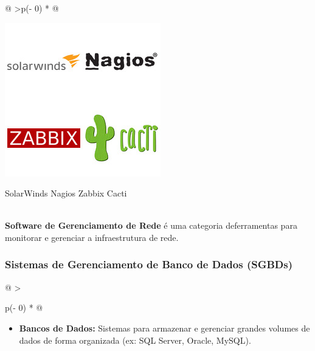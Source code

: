 \documentclass[
]{book}
\providecommand{\tightlist}{%
  \setlength{\itemsep}{0pt}\setlength{\parskip}{0pt}}
\begin{document}
\begin{longtable}[]{@{}
  >{\centering\arraybackslash}p{(\columnwidth - 0\tabcolsep) * }@{}}
\toprule\noalign{}
\endhead
\bottomrule\noalign{}
\endlastfoot
\begin{minipage}[t]{\linewidth}\centering
\begin{center}
\includegraphics{images/InfraEstrutura/software/monitoramento.jpg}

SolarWinds Nagios Zabbix Cacti
\end{center}
\end{minipage} \\
\textbf{Software de Gerenciamento de Rede} é uma categoria deferramentas para monitorar e gerenciar a infraestrutura de rede. \\
\end{longtable}

\subsubsection{Sistemas de Gerenciamento de Banco de Dados (SGBDs)}\label{sistemas-de-gerenciamento-de-banco-de-dados-sgbds}

\begin{longtable}[]{@{}
  >{\raggedright\arraybackslash}p{(\columnwidth - 0\tabcolsep) * }@{}}
\toprule\noalign{}
\endhead
\bottomrule\noalign{}
\endlastfoot
\begin{minipage}[t]{\linewidth}\raggedright
\begin{itemize}
\tightlist
\item
  \textbf{Bancos de Dados:} Sistemas para armazenar e gerenciar grandes volumes de dados de forma organizada (ex: SQL Server, Oracle, MySQL).
\end{itemize}
\end{minipage} \\
\end{longtable}
\end{document}
